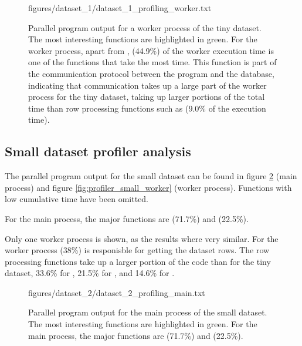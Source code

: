 \begin{figure}[ht]
  \begin{VerbatimInput}{figures/dataset_1/dataset_1_profiling_worker.txt}
    \caption[Parallel program  output for a worker process of the tiny dataset.]{Parallel program  output for a worker process of the tiny dataset.
    The most interesting functions are highlighted in green.
For the worker process, apart from ,  (44.9\%) of the worker execution time
is one of the functions that take the most time. This function
is part of the communication protocol between the program and the database, indicating that communication takes up a large part of the
worker process for the tiny dataset, taking up larger portions of the total time than row processing functions such as  (9.0\% of the execution time).}
  \label{fig:profiler_tiny_worker}
\end{VerbatimInput}
\end{figure}

\subsection{Small dataset profiler analysis}
The parallel program  output for the small dataset can be found in figure \ref{fig:profiler_small_main} (main process) and figure \ref{fig:profiler_small_worker}
(worker process). Functions with low cumulative time have been omitted.

For the main process, the major functions are  (71.7\%) and  (22.5\%).

Only one worker process is shown, as the results where very similar.
For the worker process  (38\%) is responisble for getting the dataset rows. The row processing functions take up a larger portion of the code
than for the tiny dataset, 33.6\% for , 21.5\% for , and 14.6\% for .

\begin{figure}[ht]
  \begin{VerbatimInput}{figures/dataset_2/dataset_2_profiling_main.txt}
    \caption[Parallel program  output for the main process of the small dataset.]{Parallel program  output for the main process of the small dataset.
    The most interesting functions are highlighted in green.
  For the main process, the major functions are  (71.7\%) and  (22.5\%).}
  \label{fig:profiler_small_main}
\end{VerbatimInput}
\end{figure}


